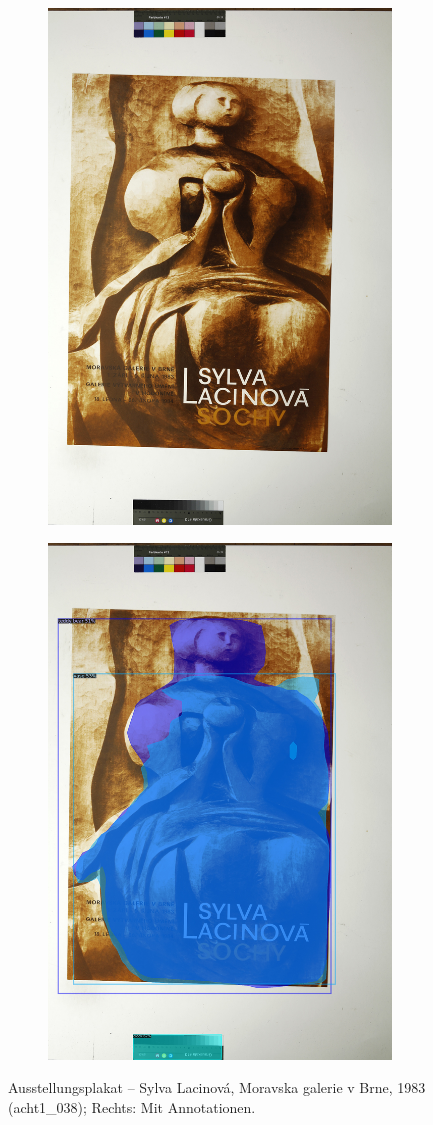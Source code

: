 \documentclass[a4paper,12pt,ngerman]{article}
\begin{document}
\newpage
\begin{landscape}
\begin{figure}[ht]
	\begin{subfigure}[b]{0.5\linewidth}
	\centering
	\includegraphics[height=\linewidth]{Abbildung_37_(acht1_038)}
	\end{subfigure}
	\begin{subfigure}[b]{0.5\linewidth}
	\centering
	\includegraphics[height=\linewidth]{Abbildung_37_(acht1_038)_with_detections}
	\end{subfigure}
	\caption{Ausstellungsplakat – Sylva Lacinová, Moravska galerie v Brne, 1983 (acht1\_038); Rechts: Mit Annotationen.}
\end{figure}
\end{landscape}
\end{document}
